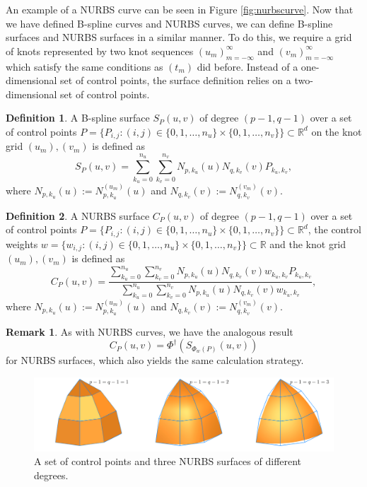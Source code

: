 \documentclass[a4paper, 11pt]{report}
\theoremstyle{definition}
\newtheorem{definition}{Definition}[section]
\newtheorem*{remark}{Remark}
\begin{document}
	An example of a NURBS curve can be seen in Figure \ref{fig:nurbscurve}. Now that we have defined B-spline curves and NURBS curves, we can define B-spline surfaces and NURBS surfaces in a similar manner. To do this, we require a grid of knots represented by two knot sequences $(u_m)_{m=-\infty}^{\infty}$ and $(v_m)_{m=-\infty}^{\infty}$ which satisfy the same conditions as $(t_m)$ did before. Instead of a one-dimensional set of control points, the surface definition relies on a two-dimensional set of control points.

	\begin{definition}
		A B-spline surface $S_P(u,v)$ of degree $(p-1, q-1)$ over a set of control points $P = \{P_{i,j} : (i,j) \in \{0,1,\ldots,n_u\} \times \{0,1,\ldots,n_v\}\} \subset \mathbb{R}^d$ on the knot grid $(u_m), (v_m)$ is defined as
			$$ S_P(u,v) = \sum_{k_u=0}^{n_u} \sum_{k_v=0}^{n_v} N_{p,k_u}(u) N_{q,k_v}(v) P_{k_u,k_v},$$
		where $N_{p,k_u}(u) := N_{p,k_u}^{(u_m)}(u)$ and $N_{q,k_v}(v) := N_{q,k_v}^{(v_m)}(v)$.
	\end{definition}

	\begin{definition}
		A NURBS surface $C_P(u,v)$ of degree $(p-1, q-1)$ over a set of control points $P = \{P_{i,j} : (i,j) \in \{0,1,\ldots,n_u\} \times \{0,1,\ldots,n_v\}\} \subset \mathbb{R}^d$, the control weights $w = \{w_{i,j} : (i,j) \in \{0,1,\ldots,n_u\} \times \{0,1,\ldots,n_v\}\} \subset \mathbb{R}$ and the knot grid $(u_m), (v_m)$ is defined as
			$$ C_P(u,v) = \frac {\sum_{k_u=0}^{n_u} \sum_{k_v=0}^{n_v} N_{p,k_u}(u) N_{q,k_v}(v) w_{k_u, k_v} P_{k_u,k_v}}{\sum_{k_u=0}^{n_u} \sum_{k_v=0}^{n_v} N_{p,k_u}(u) N_{q,k_v}(v) w_{k_u, k_v}},$$
		where $N_{p,k_u}(u) := N_{p,k_u}^{(u_m)}(u)$ and $N_{q,k_v}(v) := N_{q,k_v}^{(v_m)}(v)$.
	\end{definition}

	\begin{remark}
		As with NURBS curves, we have the analogous result
			$$ C_P(u,v) = \Phi^\dagger ({S_{\Phi_w(P)}(u,v)}) $$
		for NURBS surfaces, which also yields the same calculation strategy.
	\end{remark}

	\begin{figure}[H]
		\centering
		\includegraphics[width=\textwidth]{../tec/nurbsSurface/nurbsSurface.png}
		\caption{A set of control points and three NURBS surfaces of different degrees.}
		\label{fig:nurbssurface}
	\end{figure}
\end{document}
